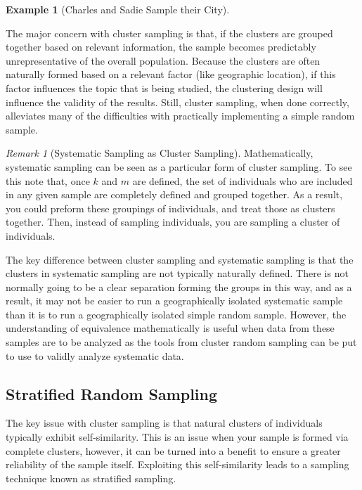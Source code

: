 \documentclass[
  letterpaper,
  DIV=11,
  numbers=noendperiod]{scrreprt}
\theoremstyle{definition}
\theoremstyle{definition}
\newtheorem{example}{Example}[chapter]
\theoremstyle{definition}
\theoremstyle{remark}
\newtheorem*{remark}{Remark}
\begin{document}
\begin{example}[Charles and Sadie Sample their
City]
\begin{tcolorbox}[enhanced jigsaw, colback=white, colframe=quarto-callout-color-frame, arc=.35mm, leftrule=.75mm, rightrule=.15mm, opacityback=0, breakable, bottomrule=.15mm, left=2mm, toprule=.15mm]
\end{tcolorbox}

\end{example}

The major concern with cluster sampling is that, if the clusters are
grouped together based on relevant information, the sample becomes
predictably unrepresentative of the overall population. Because the
clusters are often naturally formed based on a relevant factor (like
geographic location), if this factor influences the topic that is being
studied, the clustering design will influence the validity of the
results. Still, cluster sampling, when done correctly, alleviates many
of the difficulties with practically implementing a simple random
sample.

\begin{remark}[Systematic Sampling as Cluster Sampling]
Mathematically, systematic sampling can be seen as a particular form of
cluster sampling. To see this note that, once \(k\) and \(m\) are
defined, the set of individuals who are included in any given sample are
completely defined and grouped together. As a result, you could preform
these groupings of individuals, and treat those as clusters together.
Then, instead of sampling individuals, you are sampling a cluster of
individuals.

The key difference between cluster sampling and systematic sampling is
that the clusters in systematic sampling are not typically naturally
defined. There is not normally going to be a clear separation forming
the groups in this way, and as a result, it may not be easier to run a
geographically isolated systematic sample than it is to run a
geographically isolated simple random sample. However, the understanding
of equivalence mathematically is useful when data from these samples are
to be analyzed as the tools from cluster random sampling can be put to
use to validly analyze systematic data.
\end{remark}

\subsection{Stratified Random
Sampling}\label{stratified-random-sampling}

The key issue with cluster sampling is that natural clusters of
individuals typically exhibit self-similarity. This is an issue when
your sample is formed via complete clusters, however, it can be turned
into a benefit to ensure a greater reliability of the sample itself.
Exploiting this self-similarity leads to a sampling technique known as
stratified sampling.
\end{document}

